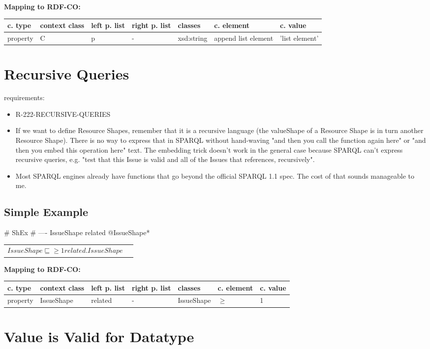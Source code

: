 \documentclass{llncs}
\newenvironment{gcotable}{
  \scriptsize
  \sffamily
  \vspace{0cm}
	\begin{center}
	\textbf{\vspace{0.4cm}Mapping to RDF-CO:} \\
  \begin{tabular}{l|l|l|l|l|l|l}
	\hline
  \textbf{c. type} & \textbf{context class} & \textbf{left p. list} & \textbf{right p. list} & \textbf{classes} & \textbf{c. element} & \textbf{c. value} \\
  \hline

}{
  \hline
  \end{tabular}
	\end{center}
}
\newenvironment{DL}{
  \vspace{0cm}
	\begin{center}
  \begin{tabular}{r l}

}{
  \end{tabular}
	\end{center}
}
\begin{document}
\begin{gcotable}
property & C & p & - & xsd:string & append list element & 'list element' \\
\end{gcotable}

\section{Recursive Queries}

requirements:

\begin{itemize}
	\item R-222-RECURSIVE-QUERIES
\end{itemize}



\begin{itemize}
	\item If we want to define Resource Shapes, remember that it is a recursive
language (the valueShape of a Resource Shape is in turn another
Resource Shape). There is no way to express that in SPARQL without
hand-waving "and then you call the function again here" or "and then
you embed this operation here" text.  The embedding trick doesn't work
in the general case because SPARQL can't express recursive queries,
e.g. "test that this Issue is valid and all of the Issues that
references, recursively".
  \item Most SPARQL engines already have
functions that go beyond the official SPARQL 1.1 spec. The cost of that
sounds manageable to me.
\end{itemize}

\subsection{Simple Example}

\begin{ex}
# ShEx
# ----
IssueShape {
    related @IssueShape*
}
\end{ex}

\begin{DL}
$IssueShape \sqsubseteq \geq1 related.IssueShape $
\end{DL}

\begin{gcotable}
property & IssueShape & related & - & IssueShape & $\geq$ & 1 \\
\end{gcotable}

\section{Value is Valid for Datatype}
\end{document}
